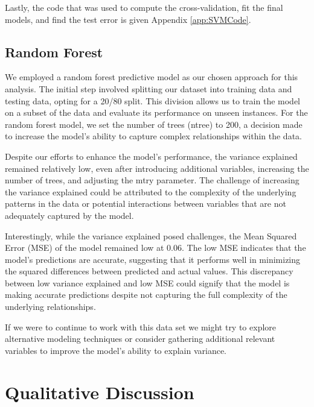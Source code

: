 \documentclass{article}
\begin{document}
    Lastly, the code that was used to compute the cross-validation, fit the final models, and find the test error is given  Appendix \ref{app:SVMCode}.
	

    \subsection{Random Forest}
    \hspace{\parindent} 

We employed a random forest predictive model as our chosen approach for this analysis. The initial step involved splitting our dataset into training data and testing data, opting for a 20/80 split. This division allows us to train the model on a subset of the data and evaluate its performance on unseen instances. For the random forest model, we set the number of trees (ntree) to 200, a decision made to increase the model's ability to capture complex relationships within the data.

Despite our efforts to enhance the model's performance, the variance explained remained relatively low, even after introducing additional variables, increasing the number of trees, and adjusting the mtry parameter. The challenge of increasing the variance explained could be attributed to the complexity of the underlying patterns in the data or potential interactions between variables that are not adequately captured by the model.

Interestingly, while the variance explained posed challenges, the Mean Squared Error (MSE) of the model remained low at 0.06. The low MSE indicates that the model's predictions are accurate, suggesting that it performs well in minimizing the squared differences between predicted and actual values. This discrepancy between low variance explained and low MSE could signify that the model is making accurate predictions despite not capturing the full complexity of the underlying relationships.

If we were to continue to work with this data set we might try to explore alternative modeling techniques  or consider gathering additional relevant variables to improve the model's ability to explain variance. 
    
\section{Qualitative Discussion}
\hspace{\parindent} 

\appendix 
\end{document}
